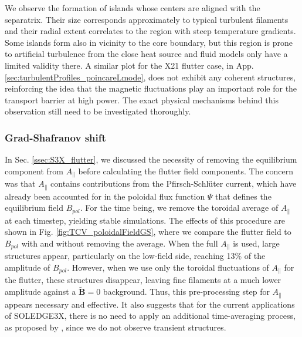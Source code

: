 We observe the formation of islands whose centers are aligned with the separatrix. Their size corresponds approximately to typical turbulent filaments and their radial extent correlates to the region with steep temperature gradients. Some islands form also in vicinity to the core boundary, but this region is prone to artificial turbulence from the close heat source and fluid models  only have a limited validity there. A similar plot for the X21 flutter case, in App. \ref{sec:turbulentProfiles_poincareLmode}, does not exhibit any coherent structures, reinforcing the idea that the magnetic fluctuations play an important role for the transport barrier at high power. The exact physical mechanisms behind this observation still need to be investigated thoroughly.


\subsubsection{Grad-Shafranov shift}
\label{ssec:TCV_GradShafranovShift}
In Sec. \ref{ssec:S3X_flutter}, we discussed the necessity of removing the equilibrium component from $A_\parallel$ before calculating the flutter field components. The concern was that $A_\parallel$ contains contributions from the Pfirsch-Schlüter current, which have already been accounted for in the poloidal flux function $\Psi$ that defines the equilibrium field $B_{pol}$. For the time being, we remove the toroidal average of $A_\parallel$ at each timestep, yielding stable simulations. The effects of this procedure are shown in Fig. \ref{fig:TCV_poloidalFieldGS}, where we compare the flutter field to $B_{pol}$ with and without removing the average. When the full $A_\parallel$ is used, large structures appear, particularly on the low-field side, reaching 13\% of the amplitude of $B_{pol}$. However, when we use only the toroidal fluctuations of $A_\parallel$ for the flutter, these structures disappear, leaving fine filaments at a much lower amplitude against a $\tilde{\textbf{B}}=0$ background. Thus, this pre-processing step for $A_\parallel$ appears necessary and effective. It also suggests that for the current applications of SOLEDGE3X, there is no need to apply an additional time-averaging process, as proposed by \cite{zhang2024}, since we do not observe transient structures.


